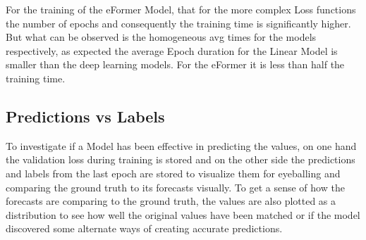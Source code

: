 \documentclass{article}
\begin{document}
For the training of the eFormer Model, that for the more complex Loss functions the number of epochs and consequently the training time is significantly higher. But what can be observed is the homogeneous avg times for the models respectively, as expected the average Epoch duration for the Linear Model is smaller than the deep learning models. For the eFormer it is less than half the training time. 

\subsection{Predictions vs Labels}

To investigate if a Model has been effective in predicting the values, on one hand the validation loss during training is stored and on the other side the predictions and labels from the last epoch are stored to visualize them for eyeballing and comparing the ground truth to its forecasts visually. To get a sense of how the forecasts are comparing to the ground truth, the values are also plotted as a distribution to see how well the original values have been matched or if the model discovered some alternate ways of creating accurate predictions. 

\newpage

\printbibliography
\end{document}
